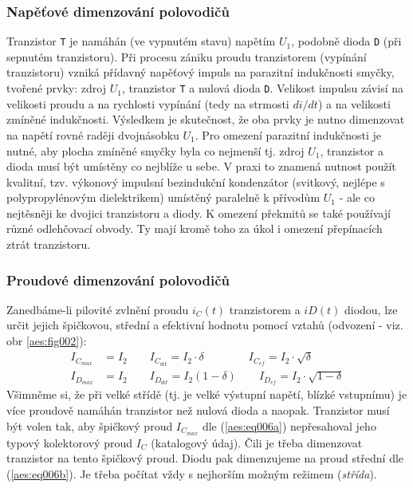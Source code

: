 {      \subsubsection{Napěťové dimenzování polovodičů}
        Tranzistor \texttt{T} je namáhán (ve vypnutém stavu) napětím \(U_1\), podobně dioda 
        \texttt{D} (při sepnutém tranzistoru). Při procesu zániku proudu tranzistorem (vypínání 
        tranzistoru) vzniká přídavný napěťový impuls na parazitní indukčnosti smyčky, tvořené 
        prvky: zdroj \(U_1\), tranzistor \texttt{T} a nulová dioda \texttt{D}. Velikost impulsu 
        závisí na velikosti proudu a na rychlosti vypínání (tedy na strmosti \(di/dt\)) a na
        velikosti zmíněné indukčnosti. Výsledkem je skutečnost, že oba prvky je nutno dimenzovat na 
        napětí rovné raději dvojnásobku \(U_1\). Pro omezení parazitní indukčnosti je nutné, aby 
        plocha zmíněné smyčky byla co nejmenší tj. zdroj \(U_1\), tranzistor a dioda musí být 
        umístěny co nejblíže u sebe. V praxi to znamená nutnost použít kvalitní, tzv. výkonový 
        impulsní bezindukční kondenzátor (svitkový, nejlépe s polypropylénovým dielektrikem) 
        umístěný paralelně k přívodům \(U_1\) - ale co nejtěsněji ke dvojici tranzistoru a diody.
        K omezení překmitů se také používají různé odlehčovací obvody. Ty mají kromě toho za úkol i
        omezení přepínacích ztrát tranzistoru.

      \subsubsection{Proudové dimenzování polovodičů}
        Zanedbáme-li pilovité zvlnění proudu \(i_C(t)\) tranzistorem a \(iD(t)\) diodou, lze určit 
        jejich špičkovou, střední a efektivní hodnotu pomocí vztahů (odvození - viz. obr  
        \ref{aes:fig002}):
        \begin{align}
          I_{C_{max}} &= I_2  \qquad  I_{C_{\text{stř}}} = I_2\cdot\delta    \qquad\qquad
                                I_{C_{ef}} = I_2\cdot\sqrt{\delta}       \label{aes:eq006a}   \\
          I_{D_{max}} &= I_2  \qquad  I_{D_{\text{stř}}} = I_2(1-\delta)     \qquad
                                I_{D_{ef}} = I_2\cdot\sqrt{1-\delta}     \label{aes:eq006b}
        \end{align}
        Všimněme si, že při velké střídě (tj. je velké výstupní napětí, blízké vstupnímu) je více 
        proudově namáhán tranzistor než nulová dioda a naopak. Tranzistor musí být volen tak, aby 
        špičkový proud \(I_{C_{max}}\) dle (\ref{aes:eq006a}) nepřesahoval jeho typový kolektorový 
        proud \(I_C\) (katalogový údaj). Čili je třeba dimenzovat tranzistor na tento špičkový 
        proud. Diodu pak dimenzujeme na proud střední dle (\ref{aes:eq006b}). Je třeba počítat vždy 
        s nejhorším možným režimem (\emph{střída}).
        
}
